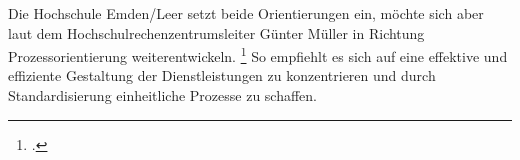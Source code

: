 Die Hochschule Emden/Leer setzt beide Orientierungen ein, möchte sich aber laut 
dem Hochschulrechenzentrumsleiter Günter Müller in Richtung 
Prozessorientierung weiterentwickeln. \footcite{gunter_muller_interview} So 
empfiehlt es sich auf eine effektive und effiziente Gestaltung der Dienstleistungen 
zu konzentrieren und durch Standardisierung einheitliche Prozesse zu schaffen.